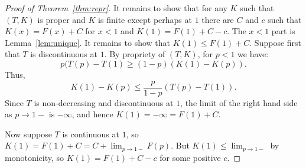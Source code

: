 \documentclass[10pt,a4paper]{amsart}
\begin{document}
\begin{proof}[Proof of Theorem~\ref{thm:repr}]
It remains to show that for any $K$ such that $(T,K)$ is proper and $K$ is finite except perhaps at $1$
there are $C$ and $c$ such that $K(x)=F(x)+C$ for $x<1$ and $K(1)=F(1)+C-c$. The $x<1$ part is 
Lemma~\ref{lem:unique}. It remains to show that $K(1)\le F(1)+C$. Suppose first that $T$ is discontinuous
at $1$. By propriety of $(T,K)$, for $p<1$ we have:
$$
	p (T(p)-T(1) \ge (1-p)(K(1)-K(p)).
$$
Thus,
$$
	K(1)-K(p) \le \frac{p}{1-p} (T(p)-T(1)).
$$
Since $T$ is non-decreasing and discontinuous at $1$, the limit of the right hand side as $p\to 1-$ is
$-\infty$, and hence $K(1)=-\infty=F(1)+C$. 

Now suppose $T$ is continuous at $1$, so $K(1)=F(1)+C=C+\lim_{p\to 1-} F(p)$. But
$K(1)\le \lim_{p\to 1-}$ by monotonicity, so $K(1)=F(1)+C-c$ for some positive $c$.
\end{proof}
\end{document}
